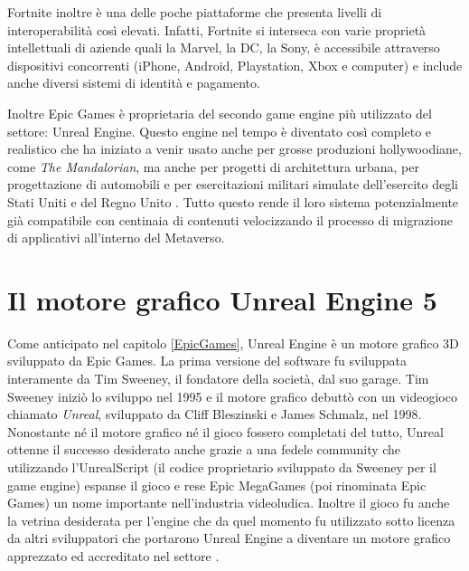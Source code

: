         Fortnite inoltre è una delle poche piattaforme che presenta livelli di interoperabilità così elevati. 
        Infatti, Fortnite si interseca con varie proprietà intellettuali di aziende quali la Marvel, la DC, la Sony, è accessibile attraverso dispositivi concorrenti (iPhone, Android, Playstation, Xbox e computer) e include anche diversi sistemi di identità e pagamento.

        Inoltre Epic Games è proprietaria del secondo game engine più utilizzato del settore: Unreal Engine.
        Questo engine nel tempo è diventato così completo e realistico che ha iniziato a venir usato anche per grosse produzioni hollywoodiane, come \textit{The Mandalorian}, ma anche per progetti di architettura urbana, per progettazione di automobili e per esercitazioni militari simulate dell'esercito degli Stati Uniti e del Regno Unito \cite{Ball2022, BallUnreal,USMilitaryUnreal}.
        Tutto questo rende il loro sistema potenzialmente già compatibile con centinaia di contenuti velocizzando il processo di migrazione di applicativi all'interno del Metaverso.

        

\section{Il motore grafico Unreal Engine 5}\label{sec:Unreal}

Come anticipato nel capitolo \ref{EpicGames}, Unreal Engine è un motore grafico 3D sviluppato da Epic Games.
%
La prima versione del software fu sviluppata interamente da Tim Sweeney, il fondatore della società, dal suo garage. Tim Sweeney iniziò lo sviluppo nel 1995 e il motore grafico debuttò con un videogioco chiamato \textit{Unreal}, sviluppato da Cliff Bleszinski e James Schmalz, nel 1998.
%
Nonostante né il motore grafico né il gioco fossero completati del tutto, Unreal ottenne il successo desiderato anche grazie a una fedele community che utilizzando l'UnrealScript (il codice proprietario sviluppato da Sweeney per il game engine) espanse il gioco e rese Epic MegaGames (poi rinominata Epic Games) un nome importante nell'industria videoludica.
%
Inoltre il gioco fu anche la vetrina desiderata per l'engine che da quel momento fu utilizzato sotto licenza da altri sviluppatori che portarono Unreal Engine a diventare un motore grafico apprezzato ed accreditato nel settore \cite{PolygonUnreal, UHistory}.
%
%


